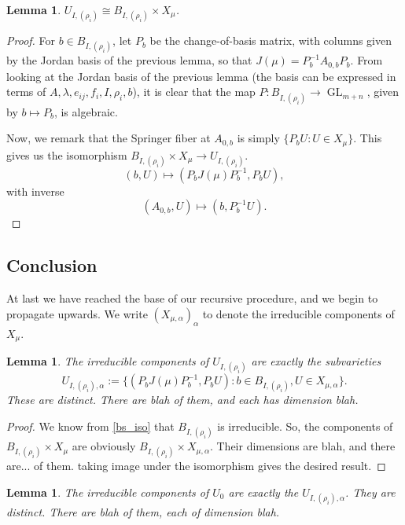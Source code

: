 \documentclass[12pt,psamsfonts]{article}
\DeclareMathOperator{\GL}{GL}
\newtheorem{lemma}[theorem]{Lemma}
\begin{document}
\begin{lemma}
    \(U_{I, (\rho_i)} \cong B_{I, (\rho_i)} \times X_\mu\).
\end{lemma}
\begin{proof}
    For \(b \in B_{I, (\rho_i)}\), let \(P_b\) be the change-of-basis matrix, with columns given by the Jordan basis of the previous lemma, so that \(J(\mu) = P_b^{-1} A_{0,b} P_b\).
    From looking at the Jordan basis of the previous lemma (the basis can be expressed in terms of \(A, \lambda, e_{ij}, f_i, I, \rho_i, b\)), it is clear that the map \(P : B_{I, (\rho_i)} \to \GL_{m + n}\), given by \(b \mapsto P_b\), is algebraic.
    \par Now, we remark that the Springer fiber at \(A_{0,b}\) is simply \(\{P_b U : U \in X_\mu\}\).
    This gives us the isomorphism \(B_{I, (\rho_i)} \times X_\mu \to U_{I, (\rho_i)}\).
    \[(b, U) \mapsto (P_b J(\mu) P_b^{-1}, P_b U),\]
    with inverse
    \[(A_{0,b}, U) \mapsto (b, P_b^{-1} U).\]
\end{proof}

\subsection{Conclusion}
At last we have reached the base of our recursive procedure, and we begin to propagate upwards.
We write \((X_{\mu, \alpha})_\alpha\) to denote the irreducible components of \(X_\mu\).
\begin{lemma}
    The irreducible components of \(U_{I, (\rho_i)}\) are exactly the subvarieties 
    \[U_{I, (\rho_i), \alpha} := \{(P_b J(\mu) P_b^{-1}, P_b U) : b \in B_{I, (\rho_i)}, U \in X_{\mu, \alpha}\}.\]
    These are distinct.  
    There are blah of them, and each has dimension blah.
\end{lemma}
\begin{proof}
    We know from \cref{bs_iso} that \(B_{I, (\rho_i)}\) is irreducible.
    So, the components of \(B_{I, (\rho_i)} \times X_\mu\) are obviously \(B_{I, (\rho_i)} \times X_{\mu, \alpha}\).
    Their dimensions are blah, and there are... of them.
    taking image under the isomorphism gives the desired result.
\end{proof}

\begin{lemma}
    The irreducible components of \(U_0\) are exactly the \(U_{I, (\rho_i), \alpha}\).
    They are distinct.
    There are blah of them, each of dimension blah.
\end{lemma}
\end{document}
